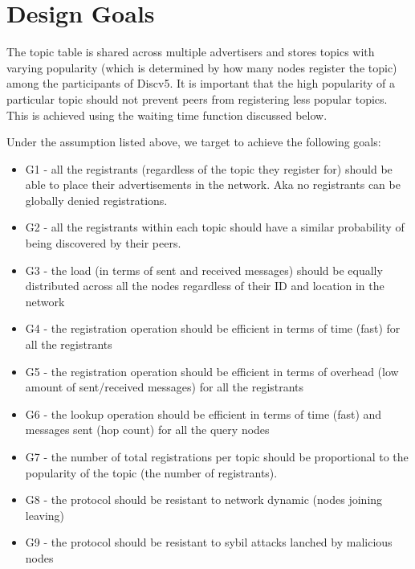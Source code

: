 \section{Design Goals}\label{sec:goals}

The topic table is shared across multiple advertisers and stores topics with varying popularity (which is determined by how many nodes register the topic) among the participants of Discv5. It is important that the high popularity of a particular topic should not prevent peers from registering less popular topics. This is achieved using the waiting time function discussed below.



Under the assumption listed above, we target to achieve the following goals:
\begin{itemize}
    \item G1 - all the registrants (regardless of the topic they register for) should be able to place their advertisements in the network. Aka no registrants can be globally denied registrations.
    \item G2 - all the registrants within each topic should have a similar probability of being discovered by their peers.
    \item G3 - the load (in terms of sent and received messages) should be equally distributed across all the nodes regardless of their ID and location in the network
    \item G4 - the registration operation should be efficient in terms of time (fast) for all the registrants
    \item G5 - the registration operation should be efficient in terms of overhead (low amount of sent/received messages) for all the registrants
    \item G6 - the lookup operation should be efficient in terms of time (fast) and messages sent (hop count) for all the query nodes
    \item G7 - the number of total registrations per topic should be proportional to the popularity of the topic (the number of registrants).
    \item G8 - the protocol should be resistant to network dynamic (nodes joining leaving)
    \item G9 - the protocol should be resistant to sybil attacks lanched by malicious nodes
\end{itemize}